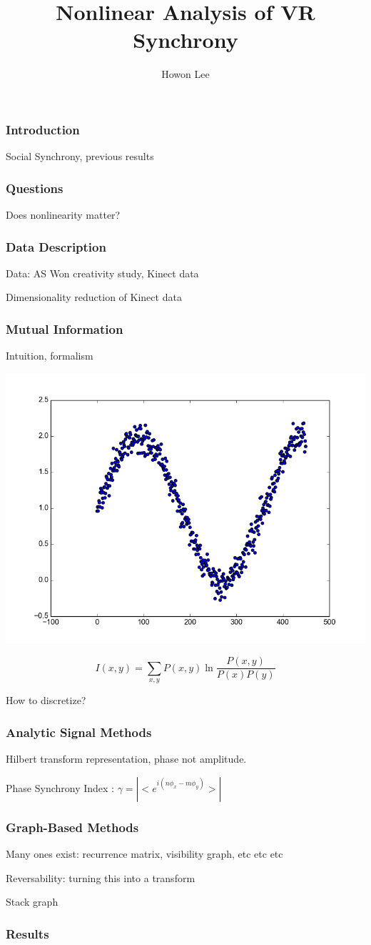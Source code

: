 \documentclass{beamer}
\begin{document}
\title{Nonlinear Analysis of VR Synchrony}
\author{Howon Lee}
\maketitle

\begin{frame}
  \frametitle{Introduction}
  Social Synchrony, previous results
\end{frame}
\begin{frame}
  \frametitle{Questions}
  Does nonlinearity matter?
\end{frame}
\begin{frame}
  \frametitle{Data Description}
  Data: AS Won creativity study, Kinect data

  Dimensionality reduction of Kinect data
\end{frame}
\begin{frame}
  \frametitle{Mutual Information}
  Intuition, formalism

  \includegraphics[scale=0.2]{mi_ex}
  
  $$I(x,y) = \sum_{x,y}P(x,y) \ln \frac{P(x,y)}{P(x)P(y)}$$

  How to discretize?
\end{frame}
\begin{frame}
  \frametitle{Analytic Signal Methods}
  Hilbert transform representation, phase not amplitude.

  Phase Synchrony Index : $\gamma = |<e^{i(n\phi_x - m\phi_y)}>|$
\end{frame}
\begin{frame}
  \frametitle{Graph-Based Methods}
  Many ones exist: recurrence matrix, visibility graph, etc etc etc

  Reversability: turning this into a transform

  Stack graph
\end{frame}
\begin{frame}
  \frametitle{Results}
\end{frame}
\end{document}
